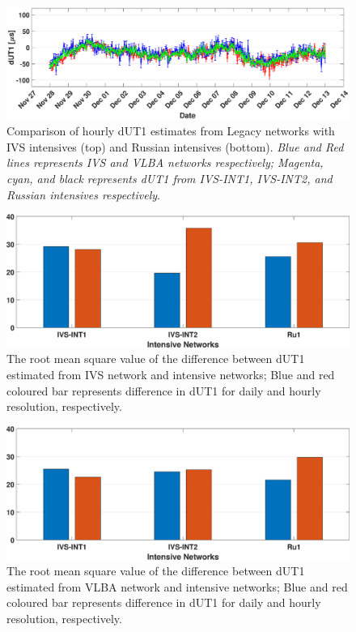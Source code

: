 \documentclass[smallextended]{svjour3}       %
\begin{document}
\begin{figure}[h]
    \centering
    \includegraphics[scale=.28]{dut1hr.eps}
    \caption{Comparison of hourly dUT1 estimates from Legacy networks with IVS intensives (top) and Russian intensives (bottom). \textit{Blue and Red lines represents IVS and VLBA networks respectively; Magenta, cyan, and black represents dUT1 from IVS-INT1, IVS-INT2, and Russian intensives respectively}.}
    \label{fig:dut1int1hr}
\end{figure}

\begin{figure}[h]
    \centering
    \includegraphics[scale=0.25]{rmsdut1xb.eps}
    \caption{The root mean square value of the difference between dUT1 estimated from IVS network and intensive networks; Blue and red coloured bar represents difference in dUT1 for daily and hourly resolution, respectively.}
    \label{fig:rmsdut1xb}
\end{figure}

\begin{figure}[h]
    \centering
    \includegraphics[scale=0.25]{rmsdut1xa.eps}
    \caption{The root mean square value of the difference between dUT1 estimated from VLBA network and intensive networks; Blue and red coloured bar represents difference in dUT1 for daily and hourly resolution, respectively.}
    \label{fig:rmsdut1xa}
\end{figure}
\end{document}
